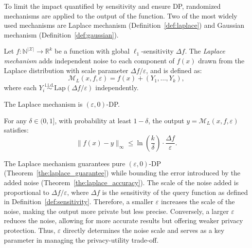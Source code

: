 To limit the impact quantified by sensitivity and ensure DP, randomized mechanisms are applied to the output of the function. Two of the most widely used mechanisms are Laplace mechanism (Definition~\ref{def:laplace}) and Gaussian mechanism (Definition~\ref{def:gaussian}).

\begin{definition}\label{def:laplace}
Let $f : \mathbb{N}^{|\mathcal{X}|} \rightarrow \mathbb{R}^k$ be a function with global $\ell_1$-sensitivity $\Delta f$. The \emph{Laplace mechanism} adds independent noise to each component of $f(x)$ drawn from the Laplace distribution with scale parameter $\Delta f / \varepsilon$, and is defined as:
\[
\mathcal{M}_L(x, f, \varepsilon) = f(x) + (Y_1, \ldots, Y_k),
\]
where each $Y_i \overset{\text{i.i.d.}}{\sim} \mathrm{Lap}(\Delta f / \varepsilon)$ independently.
\end{definition}

\begin{theorem}\label{the:laplace_guarantee}
The Laplace mechanism is $(\varepsilon,0)$-DP.
\end{theorem}

\begin{theorem}\label{the:laplace_accuracy}
For any $\delta \in (0, 1]$, with probability at least $1 - \delta$, the output $y = \mathcal{M}_L(x, f, \varepsilon)$ satisfies:
\[
\|f(x) - y\|_\infty \leq \ln\left(\frac{k}{\delta}\right) \cdot \frac{\Delta f}{\varepsilon}.
\]
\end{theorem}

The Laplace mechanism guarantees pure $(\varepsilon,0)$-DP (Theorem~\ref{the:laplace_guarantee}) while bounding the error introduced by the added noise (Theorem~\ref{the:laplace_accuracy}). The scale of the noise added is proportional to $\Delta f / \varepsilon$, where $\Delta f$ is the sensitivity of the query function as defined in Definition~\ref{def:sensitivity}. Therefore, a smaller $\varepsilon$ increases the scale of the noise, making the output more private but less precise. Conversely, a larger $\varepsilon$ reduces the noise, allowing for more accurate results but offering weaker privacy protection. Thus, $\varepsilon$ directly determines the noise scale and serves as a key parameter in managing the privacy-utility trade-off.

